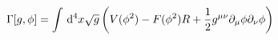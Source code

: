 \begin{equation}
\label{eq:class}
\Gamma[g,\phi]=\int\,\mathrm{d}^4x\sqrt{g}\left(V(\phi^2)- F(\phi^2)R
+{1\over2}g^{\mu\nu}\partial_\mu\phi\partial_\nu\phi\right)
\end{equation}

